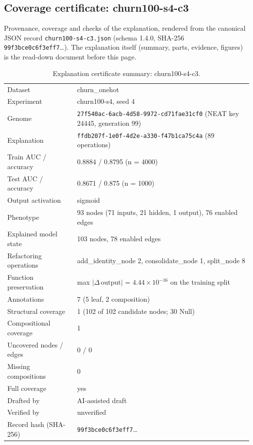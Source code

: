 \providecommand{\explaneatcertdir}[1]{}
\begin{drafted}
\section{Coverage certificate: churn100-s4-c3}\label{app:churn100-s4-c3:sec}
Provenance, coverage and checks of the explanation, rendered from the canonical JSON record \texttt{churn100-s4-c3.json} (schema 1.4.0, SHA-256 \texttt{99f3bce0c6f3eff7}\ldots). The explanation itself (summary, parts, evidence, figures) is the read-down document before this page.

\begin{table}[htbp]
\centering\small
\begin{tabularx}{\linewidth}{@{}lX@{}}
\toprule
Dataset & churn\_\allowbreak{}onehot \\
Experiment & churn100-s4, seed 4 \\
Genome & \texttt{27f540ac-6acb-4d58-9972-cd71fae31cf0} (NEAT key 24445, generation 99) \\
Explanation & \texttt{ffdb207f-1e0f-4d2e-a330-f47b1ca75c4a} (89 operations) \\
Train AUC / accuracy & 0.8884 / 0.8795 (n = 4000) \\
Test AUC / accuracy & 0.8671 / 0.875 (n = 1000) \\
Output activation & sigmoid \\
Phenotype & 93 nodes (71 inputs, 21 hidden, 1 output), 76 enabled edges \\
Explained model state & 103 nodes, 78 enabled edges \\
Refactoring operations & add\_\allowbreak{}identity\_\allowbreak{}node 2, consolidate\_\allowbreak{}node 1, split\_\allowbreak{}node 8 \\
Function preservation & max $|\Delta\,\mathrm{output}|$ = $4.44\times 10^{-16}$ on the training split \\
Annotations & 7 (5 leaf, 2 composition) \\
Structural coverage & 1 (102 of 102 candidate nodes; 30 Null) \\
Compositional coverage & 1 \\
Uncovered nodes / edges & 0 / 0 \\
Missing compositions & 0 \\
Full coverage & yes \\
Drafted by & AI-assisted draft \\
Verified by & unverified \\
Record hash (SHA-256) & \texttt{99f3bce0c6f3eff7}\ldots \\
\bottomrule
\end{tabularx}
\caption{Explanation certificate summary: churn100-s4-c3.}
\label{app:churn100-s4-c3:summary}
\end{table}

\end{drafted}
